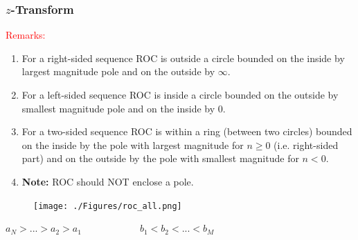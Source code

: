 \documentclass[mathserif, 10pt]{beamer} %
\begin{document}
\frame
{
\frametitle{$z$-Transform}

\textcolor{red}{Remarks:} \\ \vspace{.1in}

\begin{enumerate}
\item  For a right-sided sequence ROC is outside a circle bounded on the inside by largest magnitude pole and on the outside by $\infty$.
\item  For a left-sided sequence ROC is inside a circle bounded on the outside by smallest magnitude pole and on the inside by $0$.
\item For a two-sided sequence ROC is within a ring (between two circles) bounded on the inside by the pole with largest magnitude for $n \geq 0$ (i.e. right-sided part) and on the outside by the pole with smallest magnitude for $n < 0$.

\item \textbf{ Note:} ROC should NOT enclose a pole.

\end{enumerate}

\begin{figure}[h]

\texttt{[image: ./Figures/roc\_all.png]}
\end{figure}
 \center $a_N>...>a_2>a_1$~~~~~~~~~~~~$b_1<b_2<...<b_M$
}
\end{document}
